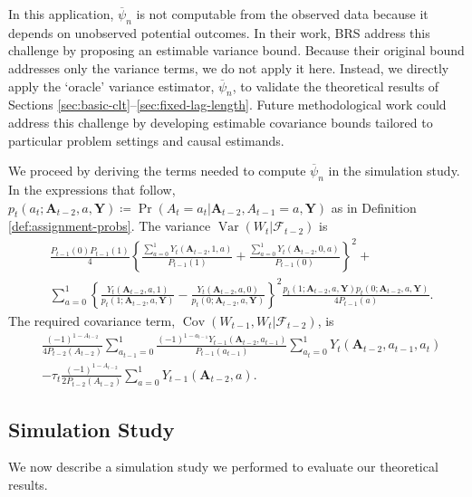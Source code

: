 \documentclass[11pt]{article}
\renewcommand\vec[1]{\boldsymbol{#1}}
\newcommand\mat[1]{\mathbf{#1}}
\DeclareMathOperator{\Cov}{Cov}
\DeclareMathOperator{\Var}{Var}
\newcommand{\F}{\mathcal{F}}
\theoremstyle{definition}
\begin{document}
In this application, $\overline{\psi}_n$ is not computable from the observed data because it depends on unobserved potential outcomes.
In their work, BRS address this challenge by proposing an estimable variance bound.
Because their original bound addresses only the variance terms, we do not apply it here.
Instead, we directly apply the `oracle' variance estimator, $\overline{\psi}_n$, to validate the theoretical results of Sections \ref{sec:basic-clt}--\ref{sec:fixed-lag-length}.
Future methodological work could address this challenge by developing estimable covariance bounds tailored to particular problem settings and causal estimands.

We proceed by deriving the terms needed to compute $\overline{\psi}_n$ in the simulation study.
In the expressions that follow, $p_t(a_t; \vec{A}_{t-2}, a, \mat{Y}) \coloneqq \Pr(A_t=a_t | \vec{A}_{t-2}, A_{t-1}=a, \mat{Y})$ as in Definition \ref{def:assignment-probs}.
The variance $\Var\left( W_t | \F_{t-2}\right)$ is
\begin{align*}%
&\frac{P_{t-1}(0) P_{t-1}(1)}{4} \left\{
\frac{\sum_{a=0}^1 Y_t\left(\vec{A}_{t-2}, 1, a\right)}{P_{t-1}(1)} +
\frac{\sum_{a=0}^1 Y_t\left(\vec{A}_{t-2}, 0, a\right)}{P_{t-1}(0)}
\right\}^2 +\nonumber\\
&\sum_{a=0}^1 \left\{
    \frac{Y_t\left(\vec{A}_{t-2}, a, 1\right)}{p_t\left(1; \vec{A}_{t-2}, a, \mat{Y}\right)} -
    \frac{Y_t\left(\vec{A}_{t-2}, a, 0\right)}{p_t\left(0; \vec{A}_{t-2}, a, \mat{Y}\right)}
\right\}^2
\frac{p_t\left(1; \vec{A}_{t-2}, a, \mat{Y}\right) p_t\left(0; \vec{A}_{t-2}, a, \mat{Y}\right)}{4 P_{t-1}(a)}.\nonumber
\end{align*}
The required covariance term, $\Cov\left( W_{t-1}, W_t | \F_{t-2}\right)$, is
\begin{align}
&\frac{(-1)^{1-A_{t-2}}}{4 P_{t-2}\left(A_{t-2}\right)} \sum_{a_{t-1}=0}^1 \frac{(-1)^{1-a_{t-1}} Y_{t-1}(\vec{A}_{t-2}, a_{t-1})}{P_{t-1}\left(a_{t-1}\right)} \sum_{a_t=0}^1 Y_t(\vec{A}_{t-2}, a_{t-1}, a_t) \label{eq:cov}\\
&- \tau_t \frac{(-1)^{1-A_{t-2}}}{2 P_{t-2}(A_{t-2})} \sum_{a=0}^1 Y_{t-1}(\vec{A}_{t-2}, a).\nonumber
\end{align}

\subsection{Simulation Study}\label{sec:simulation}

We now describe a simulation study we performed to evaluate our theoretical results.
\end{document}
